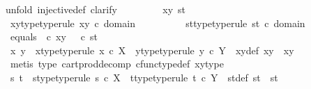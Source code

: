 \begin{isabellebody}
{\isacharparenleft}{\kern0pt}unfold\ injective{\isacharunderscore}{\kern0pt}def{\isacharcomma}{\kern0pt}\ clarify{\isacharparenright}{\kern0pt}\isanewline
\ \ \ \ \ \ \ \isamarkupfalse%
\ xy\ st\isanewline
\ \ \ \ \ \ \ \isamarkupfalse%
\ xy{\isacharunderscore}{\kern0pt}type{\isacharbrackleft}{\kern0pt}type{\isacharunderscore}{\kern0pt}rule{\isacharbrackright}{\kern0pt}{\isacharcolon}{\kern0pt}\ {\isachardoublequoteopen}xy\ {\isasymin}\isactrlsub c\ domain\ {\isasymTheta}{\isachardoublequoteclose}\isanewline
\ \ \ \ \ \ \ \isamarkupfalse%
\ st{\isacharunderscore}{\kern0pt}type{\isacharbrackleft}{\kern0pt}type{\isacharunderscore}{\kern0pt}rule{\isacharbrackright}{\kern0pt}{\isacharcolon}{\kern0pt}\ {\isachardoublequoteopen}st\ {\isasymin}\isactrlsub c\ domain\ {\isasymTheta}{\isachardoublequoteclose}\isanewline
\ \ \ \ \ \ \ \isamarkupfalse%
\ equals{\isacharcolon}{\kern0pt}\ {\isachardoublequoteopen}{\isasymTheta}\ {\isasymcirc}\isactrlsub c\ xy\ {\isacharequal}{\kern0pt}\ {\isasymTheta}\ {\isasymcirc}\isactrlsub c\ st{\isachardoublequoteclose}\isanewline
\ \ \ \ \ \ \ \isamarkupfalse%
\ x\ y\ \ x{\isacharunderscore}{\kern0pt}type{\isacharbrackleft}{\kern0pt}type{\isacharunderscore}{\kern0pt}rule{\isacharbrackright}{\kern0pt}{\isacharcolon}{\kern0pt}\ {\isachardoublequoteopen}x\ {\isasymin}\isactrlsub c\ X{\isachardoublequoteclose}\ \ y{\isacharunderscore}{\kern0pt}type{\isacharbrackleft}{\kern0pt}type{\isacharunderscore}{\kern0pt}rule{\isacharbrackright}{\kern0pt}{\isacharcolon}{\kern0pt}\ {\isachardoublequoteopen}y\ {\isasymin}\isactrlsub c\ Y{\isachardoublequoteclose}\ \ xy{\isacharunderscore}{\kern0pt}def{\isacharcolon}{\kern0pt}\ {\isachardoublequoteopen}xy\ {\isacharequal}{\kern0pt}\ {\isasymlangle}x{\isacharcomma}{\kern0pt}y{\isasymrangle}{\isachardoublequoteclose}\isanewline
\ \ \ \ \ \ \ \ \ \isamarkupfalse%
\ {\isacharparenleft}{\kern0pt}metis\ {\isasymTheta}{\isacharunderscore}{\kern0pt}type\ cart{\isacharunderscore}{\kern0pt}prod{\isacharunderscore}{\kern0pt}decomp\ cfunc{\isacharunderscore}{\kern0pt}type{\isacharunderscore}{\kern0pt}def\ xy{\isacharunderscore}{\kern0pt}type{\isacharparenright}{\kern0pt}\isanewline
\ \ \ \ \ \ \ \isamarkupfalse%
\ s\ t\ \ s{\isacharunderscore}{\kern0pt}type{\isacharbrackleft}{\kern0pt}type{\isacharunderscore}{\kern0pt}rule{\isacharbrackright}{\kern0pt}{\isacharcolon}{\kern0pt}\ {\isachardoublequoteopen}s\ {\isasymin}\isactrlsub c\ X{\isachardoublequoteclose}\ \ t{\isacharunderscore}{\kern0pt}type{\isacharbrackleft}{\kern0pt}type{\isacharunderscore}{\kern0pt}rule{\isacharbrackright}{\kern0pt}{\isacharcolon}{\kern0pt}\ {\isachardoublequoteopen}t\ {\isasymin}\isactrlsub c\ Y{\isachardoublequoteclose}\ \ st{\isacharunderscore}{\kern0pt}def{\isacharcolon}{\kern0pt}\ {\isachardoublequoteopen}st\ {\isacharequal}{\kern0pt}\ {\isasymlangle}s{\isacharcomma}{\kern0pt}t{\isasymrangle}{\isachardoublequoteclose}\isanewline

\end{isabellebody}

